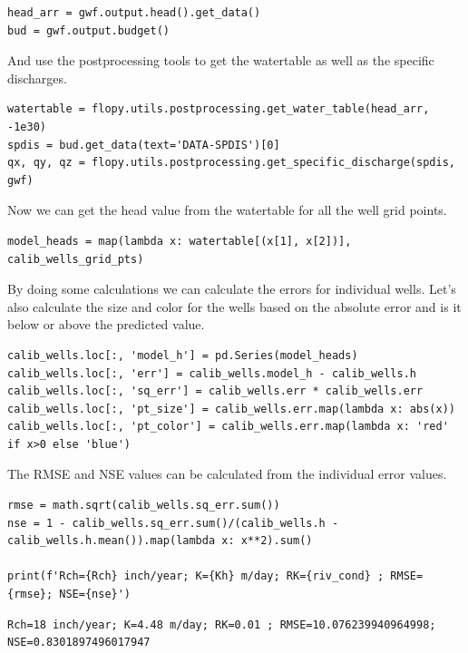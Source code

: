 \documentclass[titlepage,12pt]{unisubmission}
\begin{document}
\begin{verbatim}
head_arr = gwf.output.head().get_data()
bud = gwf.output.budget()
\end{verbatim}

And use the postprocessing tools to get the watertable as well as the specific discharges.

\begin{verbatim}
watertable = flopy.utils.postprocessing.get_water_table(head_arr, -1e30)
spdis = bud.get_data(text='DATA-SPDIS')[0]
qx, qy, qz = flopy.utils.postprocessing.get_specific_discharge(spdis, gwf)
\end{verbatim}

Now we can get the head value from the watertable for all the well grid points.

\begin{verbatim}
model_heads = map(lambda x: watertable[(x[1], x[2])], calib_wells_grid_pts)
\end{verbatim}

By doing some calculations we can calculate the errors for individual wells. Let's also calculate the size and color for the wells based on the absolute error and is it below or above the predicted value.

\begin{verbatim}
calib_wells.loc[:, 'model_h'] = pd.Series(model_heads)
calib_wells.loc[:, 'err'] = calib_wells.model_h - calib_wells.h
calib_wells.loc[:, 'sq_err'] = calib_wells.err * calib_wells.err
calib_wells.loc[:, 'pt_size'] = calib_wells.err.map(lambda x: abs(x))
calib_wells.loc[:, 'pt_color'] = calib_wells.err.map(lambda x: 'red' if x>0 else 'blue')
\end{verbatim}

The RMSE and NSE values can be calculated from the individual error values.

\begin{verbatim}
rmse = math.sqrt(calib_wells.sq_err.sum())
nse = 1 - calib_wells.sq_err.sum()/(calib_wells.h - calib_wells.h.mean()).map(lambda x: x**2).sum()

print(f'Rch={Rch} inch/year; K={Kh} m/day; RK={riv_cond} ; RMSE={rmse}; NSE={nse}')
\end{verbatim}

\begin{verbatim}
Rch=18 inch/year; K=4.48 m/day; RK=0.01 ; RMSE=10.076239940964998; NSE=0.8301897496017947
\end{verbatim}
\end{document}
